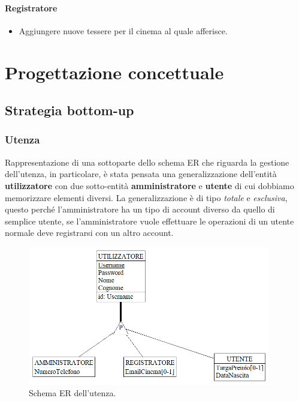 \documentclass[a4paper,12pt]{report}
\begin{document}
	\subsubsection{Registratore}
	\begin{itemize}
		\item Aggiungere nuove tessere per il cinema al quale afferisce.
	\end{itemize}
	\chapter{Progettazione concettuale}
	\section{Strategia bottom-up}
	\subsection{Utenza}
	Rappresentazione di una sottoparte dello schema ER che riguarda la gestione dell'utenza, in particolare, è stata pensata una generalizzazione dell'entità \textbf{utilizzatore} con due sotto-entità \textbf{amministratore} e \textbf{utente} di cui dobbiamo memorizzare elementi diversi. La generalizzazione è di tipo \textit{totale} e \textit{esclusiva}, questo perché l'amministratore ha un tipo di account diverso da quello di semplice utente, se l'amministratore vuole effettuare le operazioni di un utente normale deve registrarsi con un altro account.
	\begin{figure}[H]
		\centering
		\includegraphics[width=300pt]{ER/utenza.png}
		\caption{Schema ER dell'utenza.}
	\end{figure}
\end{document}
